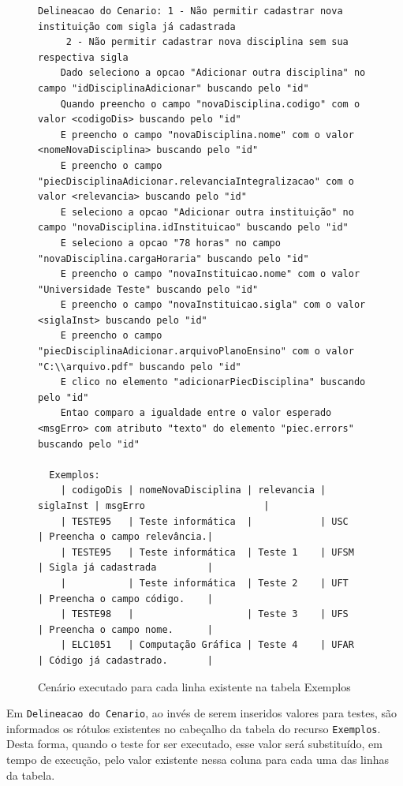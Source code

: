 \documentclass[tg]{mdtufsm}
\begin{document}
\begin{figure}[!htt]
	\begin{lstlisting}
Delineacao do Cenario: 1 - Não permitir cadastrar nova instituição com sigla já cadastrada
     2 - Não permitir cadastrar nova disciplina sem sua respectiva sigla
    Dado seleciono a opcao "Adicionar outra disciplina" no campo "idDisciplinaAdicionar" buscando pelo "id"
    Quando preencho o campo "novaDisciplina.codigo" com o valor <codigoDis> buscando pelo "id"
    E preencho o campo "novaDisciplina.nome" com o valor <nomeNovaDisciplina> buscando pelo "id"
    E preencho o campo "piecDisciplinaAdicionar.relevanciaIntegralizacao" com o valor <relevancia> buscando pelo "id"
    E seleciono a opcao "Adicionar outra instituição" no campo "novaDisciplina.idInstituicao" buscando pelo "id"
    E seleciono a opcao "78 horas" no campo "novaDisciplina.cargaHoraria" buscando pelo "id"
    E preencho o campo "novaInstituicao.nome" com o valor "Universidade Teste" buscando pelo "id"
    E preencho o campo "novaInstituicao.sigla" com o valor <siglaInst> buscando pelo "id"
    E preencho o campo "piecDisciplinaAdicionar.arquivoPlanoEnsino" com o valor "C:\\arquivo.pdf" buscando pelo "id"
    E clico no elemento "adicionarPiecDisciplina" buscando pelo "id"
    Entao comparo a igualdade entre o valor esperado <msgErro> com atributo "texto" do elemento "piec.errors" buscando pelo "id"

  Exemplos:
    | codigoDis | nomeNovaDisciplina | relevancia | siglaInst | msgErro                     |
    | TESTE95   | Teste informática  |            | USC       | Preencha o campo relevância.|
    | TESTE95   | Teste informática  | Teste 1    | UFSM      | Sigla já cadastrada         |
    |           | Teste informática  | Teste 2    | UFT       | Preencha o campo código.    |
    | TESTE98   |                    | Teste 3    | UFS       | Preencha o campo nome.      |
    | ELC1051   | Computação Gráfica | Teste 4    | UFAR      | Código já cadastrado.       |
	\end{lstlisting}
	\caption{Cenário executado para cada linha existente na tabela Exemplos}
	\label{code:Delineacao}
\end{figure}

Em \texttt{Delineacao do Cenario}, ao invés de serem inseridos valores para testes, são informados os rótulos existentes no cabeçalho da tabela do recurso \texttt{Exemplos}. Desta forma, quando o teste for ser executado, esse valor será substituído, em tempo de execução, pelo valor existente nessa coluna para cada uma das linhas da tabela.
\end{document}
